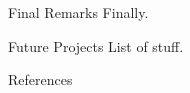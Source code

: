 \documentclass[xcolor=dvipsnames]{beamer} %
\begin{document}
\begin{frame}{Final Remarks}
	Finally.
\end{frame}

\begin{frame}{Future Projects}
	List of stuff.
\end{frame}

\appendix

% 
\nocite{gettleman2019}
\nocite{mills2016}
\nocite{mills2017}
\nocite{marsh2007}
\nocite{marsh2013}
\nocite{garcia2007}
\begin{frame}{References}

	\printbibliography[heading=none]

\end{frame}
\end{document}
